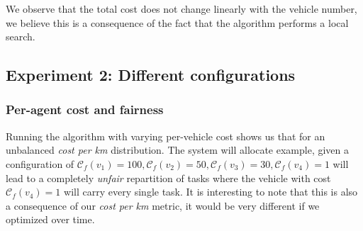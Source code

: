 \documentclass[11pt]{article}
\begin{document}
We observe that the total cost does not change linearly with the vehicle number, we believe this is a consequence of the fact that the algorithm performs a local search.

\subsection{Experiment 2: Different configurations}

\subsubsection{Per-agent cost and fairness}
Running the algorithm with varying per-vehicle cost shows us that for an unbalanced \textit{cost per km} distribution. The system will allocate example, given a configuration of $\mathcal{C}_f(v_1) = 100,\mathcal{C}_f(v_2) = 50,\mathcal{C}_f(v_3) = 30,\mathcal{C}_f(v_4) = 1$ will lead to a completely \textit{unfair} repartition of tasks where the vehicle with cost $\mathcal{C}_f(v_4) = 1$ will carry every single task. It is interesting to note that this is also a consequence of our \textit{cost per km} metric, it would be very different if we optimized over time.
\end{document}
